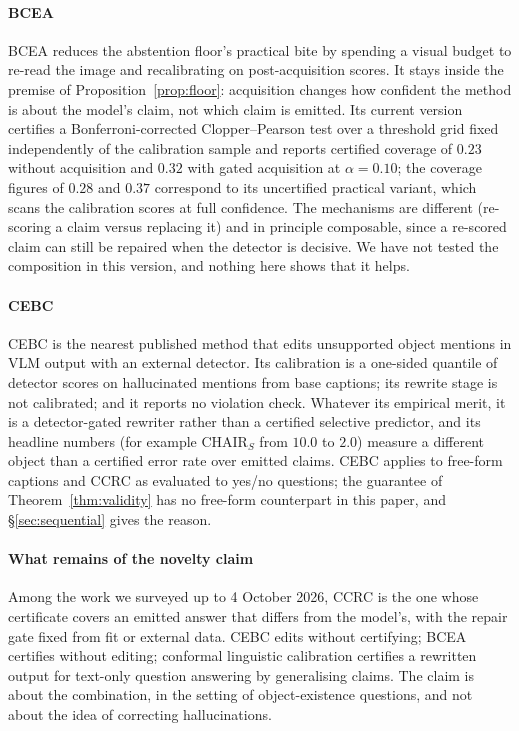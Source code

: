 \paragraph{BCEA}
BCEA reduces the abstention floor's practical bite by spending a visual budget to re-read the image and
recalibrating on post-acquisition scores. It stays inside the premise of Proposition~\ref{prop:floor}: acquisition changes how confident the
method is about the model's claim, not which claim is emitted. Its current version certifies a
Bonferroni-corrected Clopper--Pearson test over a threshold grid fixed independently of the calibration sample and
reports certified coverage of $0.23$ without acquisition and $0.32$ with gated acquisition at $\alpha=0.10$; the
coverage figures of $0.28$ and $0.37$ correspond to its uncertified practical variant, which scans the calibration
scores at full confidence. The mechanisms are different (re-scoring a claim versus replacing it) and in principle
composable, since a re-scored claim can still be repaired when the detector is decisive. We have not tested
the composition in this version, and nothing here shows that it helps.

\paragraph{CEBC}
CEBC is the nearest published method that edits unsupported object mentions in VLM output with an external detector.
Its calibration is a one-sided quantile of detector scores on hallucinated mentions from base captions; its rewrite stage
is not calibrated; and it reports no violation check. Whatever its empirical merit, it is a detector-gated rewriter rather than a certified
selective predictor, and its headline numbers (for example CHAIR$_S$ from $10.0$ to $2.0$) measure a different object
than a certified error rate over emitted claims. CEBC applies to free-form captions and CCRC as evaluated to
yes/no questions; the guarantee of Theorem~\ref{thm:validity} has no free-form counterpart in this paper, and
\S\ref{sec:sequential} gives the reason.

\paragraph{What remains of the novelty claim}
Among the work we surveyed up to 4 October 2026, CCRC is the one whose certificate covers an emitted answer
that differs from the model's, with the repair gate fixed from fit or external data. CEBC edits without certifying;
BCEA certifies without editing; conformal linguistic calibration \citep{jiang2025clc} certifies a rewritten output
for text-only question answering by generalising claims. The claim is about the combination, in the setting of
object-existence questions, and not about the idea of correcting hallucinations.
